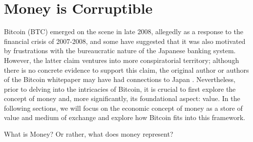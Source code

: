 \section{Money is Corruptible}
Bitcoin (BTC) emerged on the scene in late 2008, allegedly as a response to the financial crisis of 2007-2008, and some have suggested that it was also motivated by frustrations with the bureaucratic nature of the Japanese banking system. However, the latter claim ventures into more conspiratorial territory; although there is no concrete evidence to support this claim, the original author or authors of the Bitcoin whitepaper may have had connections to Japan \cite{nakamoto2008bitcoin}.
Nevertheless, prior to delving into the intricacies of Bitcoin, it is crucial to first explore the concept of money and, more significantly, its foundational aspect: value. In the following sections, we will focus on the economic concept of money as a store of value and medium of exchange and explore how Bitcoin fits into this framework.

What is Money? Or rather, what does money represent?



